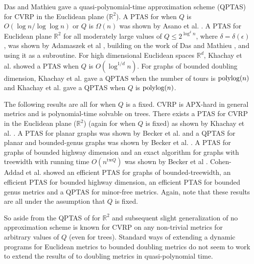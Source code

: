 \documentclass[twoside,leqno]{article}
\def\polylog{\mathop{\rm polylog}\nolimits}
\newcommand{\eps}{\epsilon}
\begin{document}
Das and Mathieu \cite{Das-Mathieu} gave a quasi-polynomial-time approximation scheme (QPTAS) for CVRP in the Euclidean plane ($\mathbb{R}^2$). A PTAS for when $Q$ is $O(\log n/\log \log n)$ or $Q$ is $\Omega(n)$ was shown by Asano et al. \cite{stoc/AsanoKTT97}. A PTAS for Euclidean plane $\mathbb{R}^2$ for all moderately large values of $Q \le 2^{\log^\delta n}$, where $\delta = \delta(\eps)$, was shown by Adamaszek et al \cite{AdamaszekCL09}, building on the work of Das and Mathieu \cite{Das-Mathieu}, and using it as a subroutine. For high dimensional Euclidean spaces $\mathbb{R}^d$, Khachay et al. \cite{Khachay-PTAS} showed a PTAS when $Q$ is $O(\log^{1/d}n)$. For graphs of bounded doubling dimension, Khachay et al. \cite{Khachay-moderatenumer} gave a QPTAS when the number of tours is $\polylog(n)$ and Khachay et al.  \cite{Khachay-moderatecapacity} gave a QPTAS when $Q$ is $\polylog(n)$.

The following results are all for when $Q$ is a fixed. CVRP is APX-hard in general metrics and is polynomial-time solvable on trees. There exists a PTAS for CVRP in the Euclidean plane ($\mathbb{R}^2$) (again for when $Q$ is fixed) as shown by Khachay et al. \cite{Khachay-PTAS}. A PTAS for planar graphs was shown by Becker et al. \cite{PlanarPTAS-Klein} and  a QPTAS for planar and bounded-genus graphs was shown by Becker et al. \cite{QPTAS-Planar-boundedgenus}.  A PTAS for graphs of bounded highway dimension and an exact algorithm for graphs with treewidth with running time $O(n^{\text{tw}Q})$ was shown by Becker et al \cite{Becker-boundedhighway}.  Cohen-Addad et al. \cite{Klein-minorfree} showed an efficient PTAS for graphs of bounded-treewidth, an efficient PTAS for bounded highway dimension, an efficient PTAS for bounded genus metrics and a QPTAS for minor-free metrics. Again, note that these results are
all under the assumption that $Q$ is fixed.

So aside from the QPTAS of \cite{Das-Mathieu} for $\mathbb{R}^2$ and subsequent slight generalization of \cite{AdamaszekCL09} no approximation scheme is known for CVRP on any non-trivial metrics for arbitrary values of $Q$ (even for trees). Standard ways of
extending a dynamic programs for Euclidean metrics to bounded doubling metrics do not seem to work to extend the results of
\cite{Das-Mathieu} to doubling metrics in quasi-polynomial time.

\end{document}
